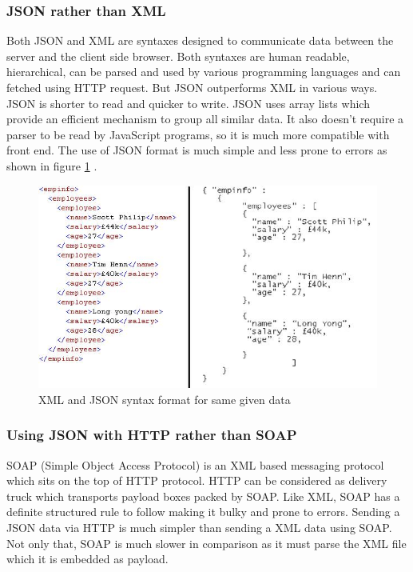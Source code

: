 \subsubsection{JSON rather than XML}
Both JSON and XML are syntaxes designed to communicate data between the server and the client side browser. Both syntaxes are human readable, hierarchical, can be parsed and used by various programming languages and can fetched using HTTP request.
But JSON outperforms XML in various ways. JSON is shorter to read and quicker to write. JSON uses array lists which provide an efficient mechanism to group all similar data. It also doesn't require a parser to be read by JavaScript programs, so it is much more compatible with front end. The use of JSON format is much simple and less prone to errors as shown in figure \ref{fig:msa:jsonvsxml} \citep{jsonvsxml}.
\begin{figure}[H]
    \centering
    \includegraphics{figs/5/jsonvsxml}
    \caption{XML and JSON syntax format for same given data}
    \label{fig:msa:jsonvsxml}
\end{figure}
\subsubsection{Using JSON with HTTP rather than SOAP}
SOAP (Simple Object Access Protocol) is an XML based messaging protocol which sits on the top of HTTP protocol. HTTP can be considered as delivery truck which transports payload boxes packed by SOAP. Like XML, SOAP has a definite structured rule to follow making it bulky and prone to errors. Sending a JSON data via HTTP is much simpler than sending a XML data using SOAP. Not only that, SOAP is much slower in comparison as it must parse the XML file which it is embedded as payload. \citep{SOAP}
